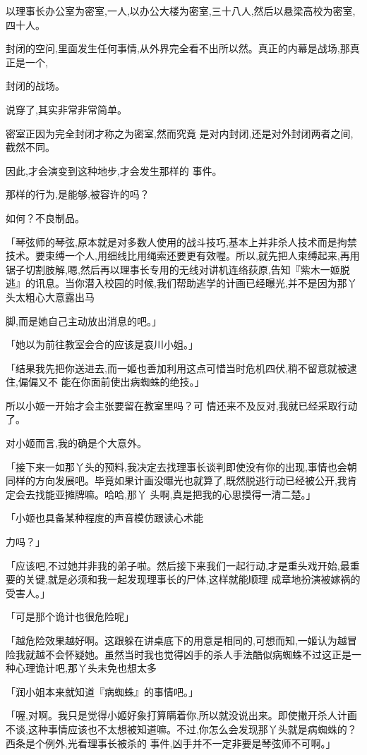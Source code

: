 \documentclass{article}
\begin{document}
以理事长办公室为密室,一人,以办公大楼为密室,三十八人,然后以悬梁高校为密室,四十人。

封闭的空问,里面发生任何事情,从外界完全看不出所以然。真正的内幕是战场,那真正是一个,
\newpage

封闭的战场。 


说穿了,其实非常非常简单。 

密室正因为完全封闭才称之为密室,然而究竟
是对内封闭,还是对外封闭两者之间,截然不同。 

因此,才会演变到这种地步,才会发生那样的
事件。 


那样的行为,是能够,被容许的吗？ 


如何？不良制品。 

「琴弦师的琴弦,原本就是对多数人使用的战斗技巧,基本上并非杀人技术而是拘禁技术。要束缚一个人,用细线比用绳索还要更有效喔。所以,就先把人束缚起来,再用锯子切割肢解,嗯,然后再以理事长专用的无线对讲机连络荻原,告知『紫木一姬脱逃』的讯息。当你潜入校园的时候,我们帮助逃学的计画已经曝光,并不是因为那丫头太粗心大意露出马
\newpage

脚,而是她自己主动放出消息的吧。」 

「她以为前往教室会合的应该是哀川小姐。」

「结果我先把你送进去,而一姬也善加利用这点可惜当时危机四伏,稍不留意就被逮住,偏偏又不
能在你面前使出病蜘蛛的绝技。」 

所以小姬一开始才会主张要留在教室里吗？可
情还来不及反对,我就已经采取行动了。 


对小姬而言,我的确是个大意外。 

「接下来一如那丫头的预料,我决定去找理事长谈判即使没有你的出现,事情也会朝同样的方向发展吧。毕竟如果计画没曝光也就算了,既然脱逃行动已经被公开,我肯定会去找能亚摊牌嘛。哈哈,那丫
头啊,真是把我的心思摸得一清二楚。」 

「小姬也具备某种程度的声音模仿跟读心术能

\newpage
力吗？」 

「应该吧,不过她并非我的弟子啦。然后接下来我们一起行动,才是重头戏开始,最重要的关键,就是必须和我一起发现理事长的尸体,这样就能顺理
成章地扮演被嫁祸的受害人。」 


「可是那个诡计也很危险呢」 

「越危险效果越好啊。这跟躲在讲桌底下的用意是相同的,可想而知,一姬认为越冒险我就越不会怀疑她。虽然当时我也觉得凶手的杀人手法酷似病蜘蛛不过这正是一种心理诡计吧,那丫头未免也想太多

「润小姐本来就知道『病蜘蛛』的事情吧。」

「喔,对啊。我只是觉得小姬好象打算瞒着你,所以就没说出来。即使撇开杀人计画不谈,这种事情应该也不太想被知道嘛。不过,你怎么会发现那丫头就是病蜘蛛的？西条是个例外,光看理事长被杀的
事件,凶手并不一定非要是琴弦师不可啊。」 
\end{document}
